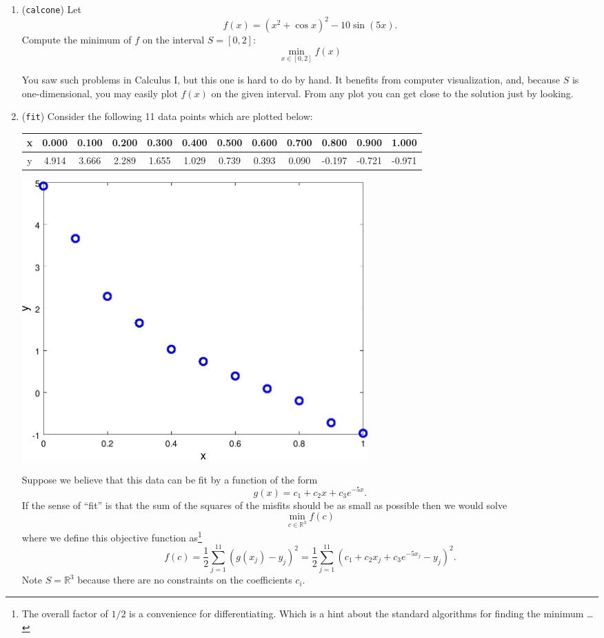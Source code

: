 \documentclass[11pt]{amsart}
\newcommand{\RR}{\mathbb{R}}
\begin{document}
\bigskip
\renewcommand{\labelenumi}{\Roman{enumi}. \quad}
\begin{enumerate}
\item (\texttt{calcone})  \quad Let
    $$f(x) = \left(x^2 + \cos x\right)^2 - 10 \sin(5 x).$$
Compute the minimum of $f$ on the interval $S=[0,2]$:
    $$\min_{x\in [0,2]} f(x)$$

You saw such problems in Calculus I, but this one is hard to do by hand.  It benefits from computer visualization, and, because $S$ is one-dimensional, you may easily plot $f(x)$ on the given interval.  From any plot you can get close to the solution just by looking.


\medskip
\item (\texttt{fit})  \quad Consider the following 11 data points which are plotted below:

\bigskip
\begin{tabular}{c|ccccccccccc}
x & 0.000 & 0.100 & 0.200 & 0.300 & 0.400 & 0.500 & 0.600 & 0.700 &  0.800 &  0.900 &  1.000 \\
\hline
y & 4.914 & 3.666 & 2.289 & 1.655 & 1.029 & 0.739 & 0.393 & 0.090 & -0.197 & -0.721 & -0.971
\end{tabular}

\bigskip
\begin{center}
\includegraphics[width=0.6\textwidth]{fitdata}
\end{center}

\medskip
Suppose we believe that this data can be fit by a function of the form
    $$g(x) = c_1 + c_2 x + c_3 e^{-5 x}.$$
If the sense of ``fit'' is that the sum of the squares of the misfits should be as small as possible then we would solve
	$$\min_{c \in \RR^3} f(c)$$
where we define this objective function as\footnote{The overall factor of $1/2$ is a convenience for differentiating.  Which is a hint about the standard algorithms for finding the minimum \dots} 
	$$f(c) = \frac{1}{2} \sum_{j=1}^{11} \left(g(x_j) - y_j\right)^2 = \frac{1}{2} \sum_{j=1}^{11} \left(c_1 + c_2 x_j + c_3 e^{-5 x_j} - y_j\right)^2.$$
Note $S=\RR^3$ because there are no constraints on the coefficients $c_i$.


\end{enumerate}
\end{document}
